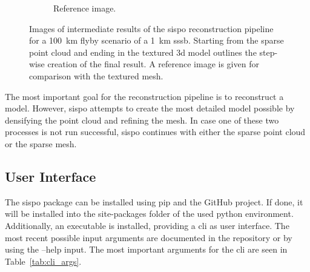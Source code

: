 \begin{figure}[htb]
\begin{subfigure}[b]{0.46\textwidth}
        \caption{Reference image.}
        \label{fig:recon_step_img}
    \end{subfigure}
    \caption{Images of intermediate results of the \gls{sispo} reconstruction pipeline for a \SI{100}{\kilo\meter} flyby scenario of a \SI{1}{\kilo\meter} \gls{sssb}. Starting from the sparse point cloud and ending in the textured \gls{3d} model outlines the step-wise creation of the final result. A reference image is given for comparison with the textured mesh.}
    \label{fig:recon_steps}
\end{figure}

The most important goal for the reconstruction pipeline is to reconstruct a model. However, \gls{sispo} attempts to create the most detailed model possible by densifying the point cloud and refining the mesh. In case one of these two processes is not run successful, \gls{sispo} continues with either the sparse point cloud or the sparse mesh.

\subsection{User Interface}
The \gls{sispo} package can be installed using pip and the GitHub project. If done, it will be installed into the site-packages folder of the used python environment. Additionally, an executable is installed, providing a \gls{cli} as user interface. The most recent possible input arguments are documented in the repository or by using the --help input. The most important arguments for the \gls{cli} are seen in Table~\ref{tab:cli_args}.

